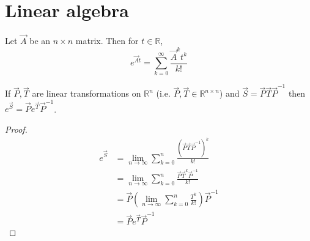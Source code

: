 \section{Linear algebra}

\begin{definition}
	Let $\vec A$ be an $n \times n$ matrix. Then for $t \in \mathbb R$,
	\begin{equation}
		e^{\vec At} = \sum_{k = 0}^\infty \frac{\vec A^k t^k}{k!}
	\end{equation}
\end{definition}

\begin{proposition}
	\label{prop:la:ptp}
	If $\vec P, \vec T$ are linear transformations on $\mathbb R^n$ (i.e. $\vec P, \vec T \in \mathbb R^{n \times n}$) and $\vec S = \vec P \vec T \vec P^{-1}$ then $e^{\vec S} = \vec P e^{\vec T} \vec P^{-1}$.
\end{proposition}

\begin{proof}
	\begin{align*}
		e^{\vec S} 	&= \lim_{n \to \infty} \sum_{k = 0}^n \frac{(\vec P \vec T \vec P^{-1})^k}{k!} \\
						&= \lim_{n \to \infty} \sum_{k = 0}^n \frac{\vec P \vec T^k \vec P^{-1}}{k!} \\
						&= \vec P \left(\lim_{n \to \infty} \sum_{k = 0}^n \frac{T^k}{k!} \right) \vec P^{-1} \\
						&= \vec P e^{\vec T} \vec P^{-1}
	\end{align*}
\end{proof}

